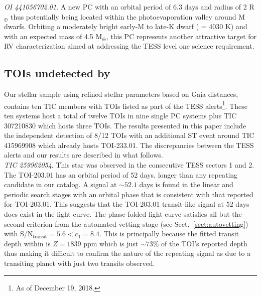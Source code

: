 \emph{OI 441056702.01}. A new PC with an orbital period of 6.3 days and radius of 2 R$_{\oplus}$
thus potentially being located within the photoevaporation valley around M dwarfs. Orbiting a moderately bright
early-M to late-K dwarf (\teff{} = 4030 K) and with an expected mass of 4.5 M$_{\oplus}$, this PC
represents another attractive target for RV characterization aimed at addressing the TESS level
one science requirement. 


\subsection{TOIs undetected by \pipeline{}} \label{sect:undet}
Our stellar sample using refined stellar parameters based on Gaia distances,
contains ten TIC members with TOIs listed as part of the TESS alerts\footnote{As of December 19, 2018.}.
These ten systems host a total of twelve TOIs in nine single PC systems
plus TIC 307210830 which hosts three TOIs. The \pipeline{} results presented in this paper
include the independent detection of 8/12 TOIs with an additional ST event around TIC 415969908 which
already hosts TOI-233.01. The discrepancies between the TESS alerts and our \pipeline{} results
are described in what follows. \\

\emph{TIC 259962054}. This star was observed in the consecutive TESS sectors 1 and 2.
The TOI-203.01 has an orbital period of 52 days, longer than any repeating
candidate in our catalog. A signal at $\sim 52.1$ days is found in the \pipeline{} linear and
periodic search stages with an orbital phase that is consistent with that reported for TOI-203.01.
This suggests that the TOI-203.01 transit-like signal at 52 days does exist in the light curve.
The phase-folded light curve satisfies all but the second criterion from the automated vetting
stage (see Sect.~\ref{sect:autovetting}) with S/N$_{\text{transit}}=5.6<c_1=8.4$. This is principally
because the fitted transit depth within \pipeline{} is $Z=1839$ ppm  which is just
$\sim 73$\% of the TOI's reported depth thus making it difficult to confirm the nature of the
repeating signal as due to a transiting planet with just two transits observed. \\


